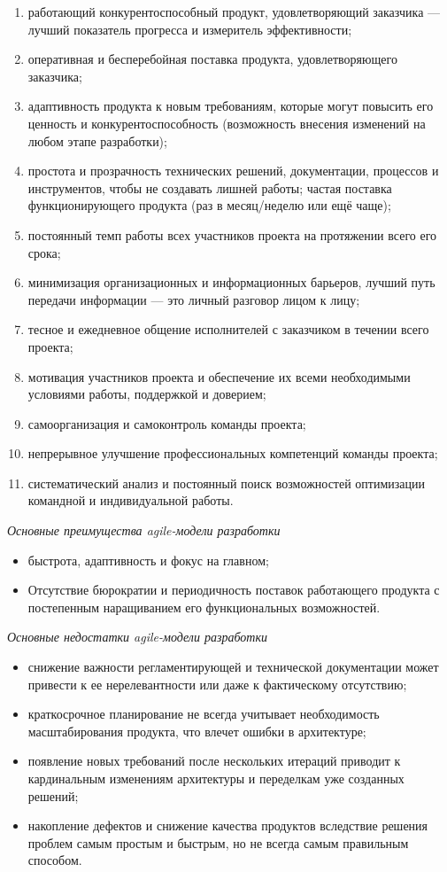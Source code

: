 \documentclass[a4paper,14pt]{extarticle}
\begin{document}
 	\begin{enumerate}
 		\item работающий конкурентоспособный продукт, удовлетворяющий заказчика — лучший показатель прогресса и измеритель эффективности;
 		\item оперативная и бесперебойная поставка продукта, удовлетворяющего заказчика;
 		\item адаптивность продукта к новым требованиям, которые могут повысить его ценность и конкурентоспособность (возможность внесения изменений на любом этапе разработки);
 		\item простота и прозрачность технических решений, документации, процессов и инструментов, чтобы не создавать лишней работы;
 		частая поставка функционирующего продукта (раз в месяц/неделю или ещё чаще);
 		\item постоянный темп работы всех участников проекта на протяжении всего его срока;
 		\item минимизация организационных и информационных барьеров, лучший путь передачи информации — это личный разговор лицом к лицу;
 		\item тесное и ежедневное общение исполнителей с заказчиком в течении всего проекта;
 		\item мотивация участников проекта и обеспечение их всеми необходимыми условиями работы, поддержкой и доверием;
 		\item самоорганизация и самоконтроль команды проекта;
 		\item непрерывное улучшение профессиональных компетенций команды проекта;
 		\item систематический анализ и постоянный поиск возможностей оптимизации командной и индивидуальной работы.
 	\end{enumerate}
 
 	\textit{Основные преимущества agile-модели разработки}
 	
 	\begin{itemize}
 		\item быстрота, адаптивность и фокус на главном;
 		\item Отсутствие бюрократии и периодичность поставок работающего продукта с постепенным наращиванием его функциональных возможностей.
 	\end{itemize}
 	
 
 	\textit{Основные недостатки agile-модели разработки}
 	
 	\begin{itemize}
 		\item снижение важности регламентирующей и технической документации может привести к ее нерелевантности или даже к фактическому отсутствию;
 		\item краткосрочное планирование не всегда учитывает необходимость масштабирования продукта, что влечет ошибки в архитектуре;
 		\item появление новых требований после нескольких итераций приводит к кардинальным изменениям архитектуры и переделкам уже созданных решений;
 		\item накопление дефектов и снижение качества продуктов вследствие решения проблем самым простым и быстрым, но не всегда самым правильным способом.
 	\end{itemize}
 	
\end{document}
